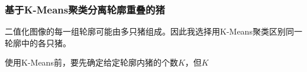 \subsubsection{基于K-Means聚类分离轮廓重叠的猪}
二值化图像的每一组轮廓可能由多只猪组成。因此我选择用K-Means聚类区别同一轮廓中的各只猪。

使用K-Means前，要先确定给定轮廓内猪的个数$K$，但$K$





